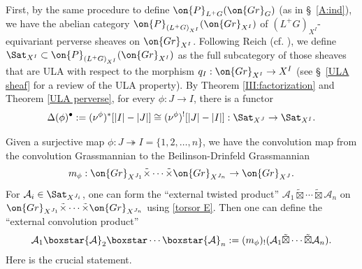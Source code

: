\documentclass[]{pcmi}
\theoremstyle{plain}
\theoremstyle{remark}
\theoremstyle{definition}
\newcommand{\mA}{{\mathcal A}}
\newcommand{\Gr}{{\on{Gr}}}
\begin{document}
First, by the same procedure to define $\on{P}_{L^+G}(\Gr_G)$ (as in \S~\ref{A:ind}), we have the abelian category $\on{P}_{(L^+G)_{X^I}}(\Gr_{X^I})$ of  $(L^+G)_{X^I}$-equivariant perverse sheaves on $\Gr_{X^I}$. Following Reich (cf. \cite{Rei}), we define $\Sat_{X^I}\subset \on{P}_{(L^+G)_{X^I}}(\Gr_{X^I})$ as the full subcategory of those sheaves that are ULA with respect to the morphism $q_I:\Gr_{X^I}\to X^I$ (see \S~\ref{ULA sheaf} for a review of the ULA property). By Theorem \ref{III:factorization} and Theorem \ref{ULA perverse}, for every $\phi: J\to I$, there is a functor
\begin{equation}\label{Sat restriction}
\Delta(\phi)^\bullet:=(\nu^\phi)^*[|I|-|J|]\cong(\nu^\phi)^![|J|-|I|]:\Sat_{X^J}\to\Sat_{X^I}.
\end{equation}


Given a surjective map $\phi:J\twoheadrightarrow I=\{1,2,\ldots,n\}$,  we have the convolution map from the convolution Grassmannian to the Beilinson-Drinfeld Grassmannian
\[m_\phi:\Gr_{X^{J_1}}\tilde\times\cdots\tilde\times\Gr_{X^{J_n}}\to \Gr_{X^J}.\]
For $\mA_i\in\Sat_{X^{J_i}}$, one can form the ``external twisted product'' $\mA_1\tilde\boxtimes\cdots\tilde\boxtimes\mA_n$ on $\Gr_{X^{J_1}}\tilde\times\cdots\tilde\times\Gr_{X^{J_n}}$ using \eqref{torsor E}. Then one can define the ``external convolution product'' 
\[\mA_1\boxstar \mA_2\boxstar \cdots\boxstar \mA_n:=(m_\phi)_!(\mA_1\tilde\boxtimes\cdots\tilde\boxtimes\mA_n).\]
Here is the crucial statement.
\end{document}

